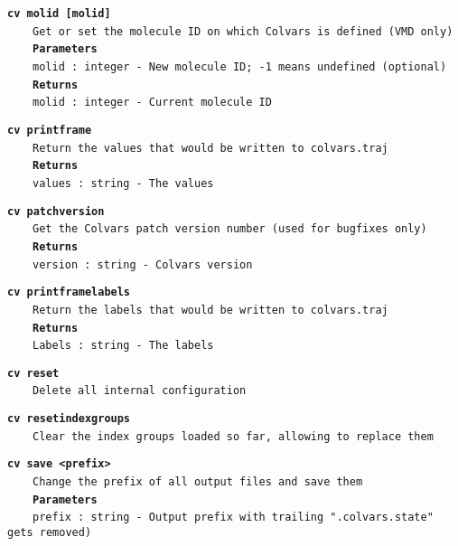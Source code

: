 \begin{mdexampleinput}{}
\texttt{\textbf{cv molid [molid]}}
\\
\-~~~~\texttt{Get or set the molecule ID on which Colvars is defined (VMD only)}
\\
\-~~~~\texttt{\textbf{Parameters}}
\\
\-~~~~\texttt{molid : integer - New molecule ID; -1 means undefined (optional)}
\\
\-~~~~\texttt{\textbf{Returns}}
\\
\-~~~~\texttt{molid : integer - Current molecule ID}
\end{mdexampleinput}
\begin{mdexampleinput}{}
\texttt{\textbf{cv printframe}}
\\
\-~~~~\texttt{Return the values that would be written to colvars.traj}
\\
\-~~~~\texttt{\textbf{Returns}}
\\
\-~~~~\texttt{values : string - The values}
\end{mdexampleinput}
\begin{mdexampleinput}{}
\texttt{\textbf{cv patchversion}}
\\
\-~~~~\texttt{Get the Colvars patch version number (used for bugfixes only)}
\\
\-~~~~\texttt{\textbf{Returns}}
\\
\-~~~~\texttt{version : string - Colvars version}
\end{mdexampleinput}
\begin{mdexampleinput}{}
\texttt{\textbf{cv printframelabels}}
\\
\-~~~~\texttt{Return the labels that would be written to colvars.traj}
\\
\-~~~~\texttt{\textbf{Returns}}
\\
\-~~~~\texttt{Labels : string - The labels}
\end{mdexampleinput}
\begin{mdexampleinput}{}
\texttt{\textbf{cv reset}}
\\
\-~~~~\texttt{Delete all internal configuration}
\end{mdexampleinput}
\begin{mdexampleinput}{}
\texttt{\textbf{cv resetindexgroups}}
\\
\-~~~~\texttt{Clear the index groups loaded so far, allowing to replace them}
\end{mdexampleinput}
\begin{mdexampleinput}{}
\texttt{\textbf{cv save <prefix>}}
\\
\-~~~~\texttt{Change the prefix of all output files and save them}
\\
\-~~~~\texttt{\textbf{Parameters}}
\\
\-~~~~\texttt{prefix : string - Output prefix with trailing ".colvars.state" gets removed)}
\end{mdexampleinput}
